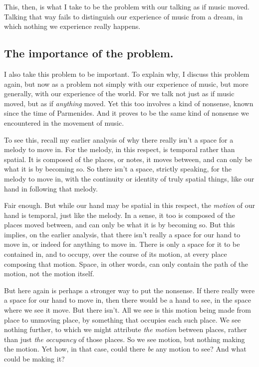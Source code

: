 \documentclass[12pt]{memoir}
\begin{document}
This, then, is what I take to be the problem with
our talking as if music moved. Talking that way
fails to distinguish our experience of music from
a dream, in which nothing we experience really
happens.

\subsection{The importance of the problem.}

I also take this problem to be important. To
explain why, I discuss this problem again, but
now as a problem not simply with our experience
of music, but more generally, with our experience
of the world. For we talk not just as if music
moved, but as if \emph{anything} moved. Yet this
too involves a kind of nonsense, known since the
time of Parmenides. And it proves to be the same
kind of nonsense we encountered in the movement of
music.

To see this, recall my earlier analysis of why
there really isn't a space for a melody to move
in. For the melody, in this respect, is temporal
rather than spatial. It is composed of the places,
or notes, it moves between, and can only be what
it is by becoming so. So there isn't a space,
strictly speaking, for the melody to move in,
with the continuity or identity of truly spatial
things, like our hand in following that melody.

Fair enough. But while our hand may be spatial
in this respect, the \emph{motion} of our hand
is temporal, just like the melody. In a sense,
it too is composed of the places moved between,
and can only be what it is by becoming so. But
this implies, on the earlier analysis, that there
isn't really a space for our hand to move in, or
indeed for anything to move in. There is only a
space for it to be contained in, and to occupy,
over the course of its motion, at every place
composing that motion. Space, in other words,
can only contain the path of the motion, not the
motion itself.

But here again is perhaps a stronger way to put
the nonsense. If there really were a space for
our hand to move in, then there would be a hand
to see, in the space where we see it move. But
there isn't. All we see is this motion being
made from place to unmoving place, by something
that occupies each such place. We see nothing
further, to which we might attribute \emph{the
motion} between places, rather than just \emph{the
occupancy} of those places. So we see motion, but
nothing making the motion. Yet how, in that case,
could there \emph{be} any motion to see? And what
could be making it?
\end{document}
